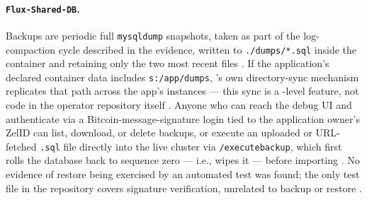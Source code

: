 \paragraph{\texttt{Flux-Shared-DB}.} Backups are periodic full \texttt{mysqldump}
snapshots, taken as part of the log-compaction cycle described in the evidence,
written to \texttt{./dumps/*.sql} inside the container and retaining only the two most
recent files . If the
application's declared container data includes \texttt{s:/app/dumps}, \FluxOS's own
directory-sync mechanism replicates that path across the app's instances --- this
sync is a \FluxOS-level feature, not code in the operator repository itself
. Anyone who can reach the debug UI and
authenticate via a Bitcoin-message-signature login tied to the application owner's
ZelID can list, download, or delete backups, or execute an uploaded or
URL-fetched \texttt{.sql} file directly into the live cluster via
\texttt{/executebackup}, which first rolls the database back to sequence zero --- i.e.,
wipes it --- before importing .
No evidence of restore being exercised by an automated test was found; the only test
file in the repository covers signature verification, unrelated to backup or restore
.

